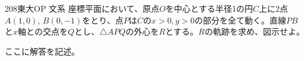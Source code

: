\begin{thm}{208}{}{東大OP 文系}
 座標平面において、原点$O$を中心とする半径1の円$C$上に2点$A(1,0)$, $B(0,-1)$をとり、点$P$は$C$の$x>0, y>0$の部分を全て動く。直線$PB$と$x$軸との交点を$Q$とし、$\triangle{APQ}$の外心を$R$とする。$R$の軌跡を求め、図示せよ。
\end{thm}

ここに解答を記述。